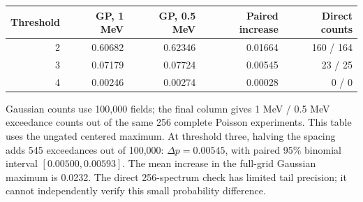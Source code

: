 \begin{center}\small
\begin{tabular}{rrrrr}\toprule
Threshold & GP, 1 MeV & GP, 0.5 MeV & Paired increase & Direct counts\\\midrule
2 & 0.60682 & 0.62346 & 0.01664 & 160 / 164\\
3 & 0.07179 & 0.07724 & 0.00545 & 23 / 25\\
4 & 0.00246 & 0.00274 & 0.00028 & 0 / 0\\
\bottomrule\end{tabular}\end{center}
{\small Gaussian counts use 100,000 fields; the final column gives 1 MeV / 0.5 MeV exceedance counts out of the same 256 complete Poisson experiments. This table uses the ungated centered maximum.}
At threshold three, halving the spacing adds 545 exceedances out of 100,000: $\Delta p=0.00545$, with paired 95\% binomial interval $[0.00500,0.00593]$. The mean increase in the full-grid Gaussian maximum is 0.0232. The direct 256-spectrum check has limited tail precision; it cannot independently verify this small probability difference.

